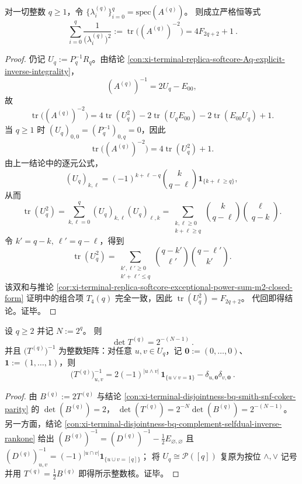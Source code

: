 \begin{corollary}\label{cor:xi-terminal-replica-softcore-exceptional-reciprocal-square-sum-fibonacci}
对一切整数 \(q\ge 1\)，令 \(\{\lambda_i^{(q)}\}_{i=0}^{q}=\mathrm{spec}(A^{(q)})\)。
则成立严格恒等式
\[
\boxed{\ \sum_{i=0}^{q}\frac{1}{\bigl(\lambda_i^{(q)}\bigr)^2}
:=\operatorname{tr}\bigl((A^{(q)})^{-2}\bigr)
=4F_{2q+2}+1\ } .
\]
\end{corollary}
\begin{proof}
仍记 \(U_q:=P_q^{-1}R_q\)。由结论 \ref{con:xi-terminal-replica-softcore-Aq-explicit-inverse-integrality}，
\[
(A^{(q)})^{-1}=2U_q-E_{00},
\]
故
\[
\operatorname{tr}\bigl((A^{(q)})^{-2}\bigr)
=4\operatorname{tr}(U_q^2)-2\operatorname{tr}(U_qE_{00})-2\operatorname{tr}(E_{00}U_q)+1.
\]
当 \(q\ge1\) 时 \((U_q)_{0,0}=(P_q^{-1})_{0,q}=0\)，因此
\[
\operatorname{tr}\bigl((A^{(q)})^{-2}\bigr)=4\operatorname{tr}(U_q^2)+1.
\]
由上一结论中的逐元公式，
\[
(U_q)_{k,\ell}=(-1)^{k+\ell-q}\binom{k}{q-\ell}\mathbf 1_{\{k+\ell\ge q\}},
\]
从而
\[
\operatorname{tr}(U_q^2)
=\sum_{k,\ell=0}^{q}(U_q)_{k,\ell}(U_q)_{\ell,k}
=\sum_{\substack{k,\ell\ge0\\k+\ell\ge q}}
\binom{k}{q-\ell}\binom{\ell}{q-k}.
\]
令 \(k'=q-k,\ \ell'=q-\ell\)，得到
\[
\operatorname{tr}(U_q^2)
=\sum_{\substack{k',\ell'\ge0\\k'+\ell'\le q}}
\binom{q-k'}{\ell'}\binom{q-\ell'}{k'}.
\]
该双和与推论 \ref{cor:xi-terminal-replica-softcore-exceptional-power-sum-m2-closed-form}
证明中的组合项 \(T_4(q)\) 完全一致，因此
\(
\operatorname{tr}(U_q^2)=F_{2q+2}
\)。
代回即得结论。证毕。
\end{proof}

\begin{corollary}[全矩阵行列式的塌缩与整数逆核]\label{cor:xi-terminal-replica-softcore-Tq-det-and-integer-inverse-kernel}
设 \(q\ge 2\) 并记 \(N:=2^q\)。
则
\[
\boxed{\ \det T^{(q)}=2^{-(N-1)}\ }.
\]
并且 \(\bigl(T^{(q)}\bigr)^{-1}\) 为整数矩阵：对任意 \(u,v\in U_q\)，记 \(\mathbf{0}:=(0,\dots,0)\)、\(\mathbf{1}:=(1,\dots,1)\)，则
\[
\boxed{\ \bigl(T^{(q)}\bigr)^{-1}_{u,v}
=2(-1)^{|u\wedge v|}\,\mathbf{1}_{\{u\vee v=\mathbf{1}\}}
-\delta_{u,\mathbf{0}}\delta_{v,\mathbf{0}}\ } .
\]
\end{corollary}
\begin{proof}
由 \(B^{(q)}:=2T^{(q)}\) 与结论 \ref{con:xi-terminal-disjointness-bq-smith-snf-coker-parity} 的 \(\det(B^{(q)})=2\)，
\(
\det(T^{(q)})=2^{-N}\det(B^{(q)})=2^{-(N-1)}
\)。
另一方面，结论 \ref{con:xi-terminal-disjointness-bq-complement-selfdual-inverse-rankone} 给出
\(
(B^{(q)})^{-1}=(D^{(q)})^{-1}-\frac12E_{\varnothing,\varnothing}
\)
且 \((D^{(q)})^{-1}_{u,v}=(-1)^{|u\cap v|}\mathbf{1}_{\{u\cup v=[q]\}}\)；
将 \(U_q\cong\mathcal P([q])\) 复原为按位 \(\wedge,\vee\) 记号并用 \(T^{(q)}=\frac12B^{(q)}\) 即得所示整数核。证毕。
\end{proof}


